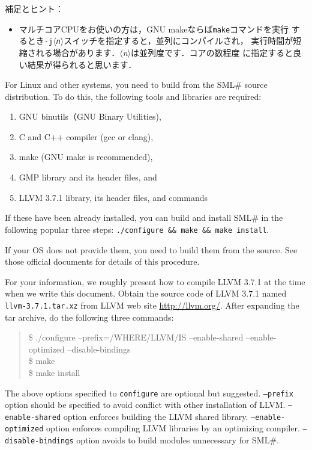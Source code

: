 \documentclass{jbook}
\newcommand{\smlsharp}{SML\#}
\newcommand{\nonterm}[1]{\mbox{$\langle$}{\it #1}\mbox{$\rangle$}}
\newenvironment{program}{\begin{quote}\begin{tt}}%
                        {\end{tt}\end{quote}}
\begin{document}
補足とヒント：
\begin{itemize}
\item マルチコアCPUをお使いの方は，GNU makeならば{\tt make}コマンドを実行
するとき{\tt -j\nonterm{n}}スイッチを指定すると，並列にコンパイルされ，
実行時間が短縮される場合があります．\nonterm{n}は並列度です．コアの数程度
に指定すると良い結果が得られると思います．
\end{itemize}

\else%
	For Linux and other systems, you need to build from the
\smlsharp{} source distribution.
	To do this, the following tools and libraries are required:
\begin{enumerate}
\item GNU binutils（GNU Binary Utilities),
\item C and C++ compiler (gcc or clang),
\item make (GNU make is recommended),
\item GMP library and its header files, and
\item LLVM 3.7.1 library, its header files, and commands
\end{enumerate}
	If these have been already installed, you can build and install
\smlsharp{} in the following popular three steps:
{\tt ./configure \&\& make \&\& make install}.

	If your OS does not provide them, you need to build them from the
source.
	See those official documents for details of this procedure.

	For your information, we roughly present how to compile LLVM 3.7.1
at the time when we write this document.
	Obtain the source code of LLVM 3.7.1 named
{\tt llvm-3.7.1.tar.xz}
from LLVM web site \url{http://llvm.org/}.
	After expanding the tar archive,
do the following three commands:
\begin{program}
\$ ./configure --prefix=/WHERE/LLVM/IS --enable-shared --enable-optimized --disable-bindings\\
\$ make\\
\$ make install
\end{program}
	The above options specified to {\tt configure} are optional but suggested.
	{\tt --prefix} option should be specified to avoid conflict with
other installation of LLVM.
	{\tt --enable-shared} option enforces building the LLVM shared library.
	{\tt --enable-optimized} option enforces compiling LLVM libraries by
an optimizing compiler.
	{\tt --disable-bindings} option avoids to build modules unnecessary
for \smlsharp{}.
\end{document}
